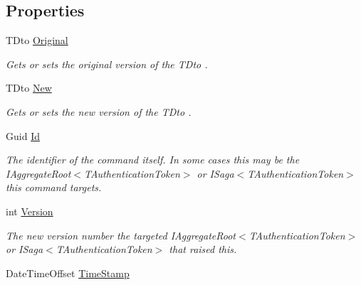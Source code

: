 \subsection*{Properties}
\begin{DoxyCompactItemize}
\item 
T\+Dto \hyperlink{classCqrs_1_1Events_1_1DtoAggregateEvent_a62b5fa272dfbe104d8f37500e3d5cc45_a62b5fa272dfbe104d8f37500e3d5cc45}{Original}
\begin{DoxyCompactList}\small\item\em Gets or sets the original version of the {\itshape T\+Dto} . \end{DoxyCompactList}\item 
T\+Dto \hyperlink{classCqrs_1_1Events_1_1DtoAggregateEvent_a702bd5605d7ce538b992c2d43198194c_a702bd5605d7ce538b992c2d43198194c}{New}
\begin{DoxyCompactList}\small\item\em Gets or sets the new version of the {\itshape T\+Dto} . \end{DoxyCompactList}\item 
Guid \hyperlink{classCqrs_1_1Events_1_1DtoAggregateEvent_ad5f763ecd79dc9b4882ed15239242d17_ad5f763ecd79dc9b4882ed15239242d17}{Id}
\begin{DoxyCompactList}\small\item\em The identifier of the command itself. In some cases this may be the I\+Aggregate\+Root$<$\+T\+Authentication\+Token$>$ or I\+Saga$<$\+T\+Authentication\+Token$>$ this command targets. \end{DoxyCompactList}\item 
int \hyperlink{classCqrs_1_1Events_1_1DtoAggregateEvent_a2c3a579eba3effd19cf0ae740ca33389_a2c3a579eba3effd19cf0ae740ca33389}{Version}
\begin{DoxyCompactList}\small\item\em The new version number the targeted I\+Aggregate\+Root$<$\+T\+Authentication\+Token$>$ or I\+Saga$<$\+T\+Authentication\+Token$>$ that raised this. \end{DoxyCompactList}\item 
Date\+Time\+Offset \hyperlink{classCqrs_1_1Events_1_1DtoAggregateEvent_a0acde01c4c3cf985f7fc170bc9658278_a0acde01c4c3cf985f7fc170bc9658278}{Time\+Stamp}

\end{DoxyCompactItemize}
